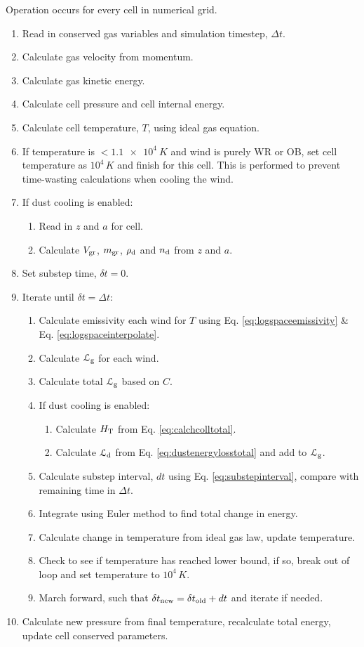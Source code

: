 Operation occurs for every cell in numerical grid.

\begin{enumerate}
  \item Read in conserved gas variables and simulation timestep, $\Delta t$.
  \item Calculate gas velocity from momentum.
  \item Calculate gas kinetic energy.
  \item Calculate cell pressure and cell internal energy.
  \item Calculate cell temperature, $T$, using ideal gas equation.
  \item If temperature is $<\SI{1.1e4}{K}$ and wind is purely WR or OB, set cell temperature as $10^4\,\si{K}$ and finish for this cell. This is performed to prevent time-wasting calculations when cooling the wind.
  \item If dust cooling is enabled:
  \begin{enumerate}
    \item Read in $z$ and $a$ for cell.
    \item Calculate $V_\text{gr}$, $m_\text{gr}$, $\rho_\text{d}$ and $n_\text{d}$ from $z$ and $a$.
  \end{enumerate}
  \item Set substep time, $\delta t = 0$.
  \item Iterate until $\delta t = \Delta t$:
  \begin{enumerate}
    \item Calculate emissivity each wind for $T$ using Eq. \ref{eq:logspaceemissivity} \& Eq. \ref{eq:logspaceinterpolate}.
    \item Calculate $\mathcal{L}_\text{g}$ for each wind.
    \item Calculate total $\mathcal{L}_\text{g}$ based on $C$.
    \item If dust cooling is enabled:
    \begin{enumerate}
      \item Calculate $H_\text{T}$ from Eq. \ref{eq:calchcolltotal}.
      \item Calculate $\mathcal{L}_\text{d}$ from Eq. \ref{eq:dustenergylosstotal} and add to $\mathcal{L}_\text{g}$.
    \end{enumerate}
    \item Calculate substep interval, $dt$ using Eq. \ref{eq:substepinterval}, compare with remaining time in $\Delta t$.
    \item Integrate using Euler method to find total change in energy.
    \item Calculate change in temperature from ideal gas law, update temperature.
    \item Check to see if temperature has reached lower bound, if so, break out of loop and set temperature to $10^4\,\si{K}$.
    \item March forward, such that $\delta t_\text{new} = \delta t_\text{old} + dt$ and iterate if needed.
  \end{enumerate}
  \item Calculate new pressure from final temperature, recalculate total energy, update cell conserved parameters.
\end{enumerate}

